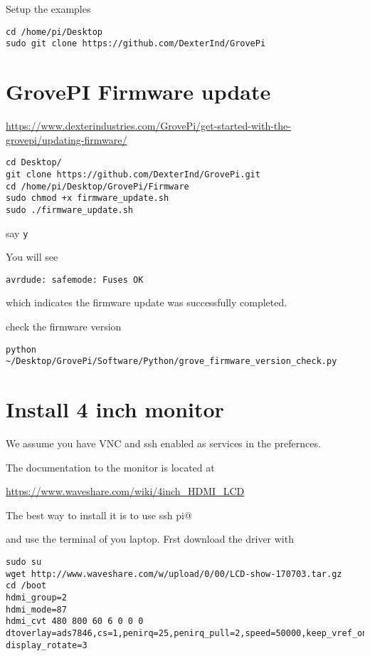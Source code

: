 Setup the examples

\begin{lstlisting}
cd /home/pi/Desktop
sudo git clone https://github.com/DexterInd/GrovePi
\end{lstlisting}

\section{GrovePI Firmware update}

\url{https://www.dexterindustries.com/GrovePi/get-started-with-the-grovepi/updating-firmware/}

\begin{lstlisting}
cd Desktop/
git clone https://github.com/DexterInd/GrovePi.git
cd /home/pi/Desktop/GrovePi/Firmware
sudo chmod +x firmware_update.sh
sudo ./firmware_update.sh
\end{lstlisting}

say \texttt{y}

You will see

\begin{lstlisting}
avrdude: safemode: Fuses OK
\end{lstlisting}

which indicates the firmware update was successfully completed.

check the firmware version

\begin{lstlisting}
python ~/Desktop/GrovePi/Software/Python/grove_firmware_version_check.py
\end{lstlisting}

\section{Install 4 inch monitor}

We assume you have VNC and ssh enabled as services in the prefernces.

The documentation to the monitor is located at

\url{https://www.waveshare.com/wiki/4inch_HDMI_LCD}

The best way to install it is to use ssh pi@

and use the terminal of you laptop. Frst download the driver with

\begin{lstlisting}
sudo su
wget http://www.waveshare.com/w/upload/0/00/LCD-show-170703.tar.gz
cd /boot
hdmi_group=2
hdmi_mode=87
hdmi_cvt 480 800 60 6 0 0 0
dtoverlay=ads7846,cs=1,penirq=25,penirq_pull=2,speed=50000,keep_vref_on=0,swapxy=0,pmax=255,xohms=150,xmin=200,xmax=3900,ymin=200,ymax=3900
display_rotate=3
\end{lstlisting}

